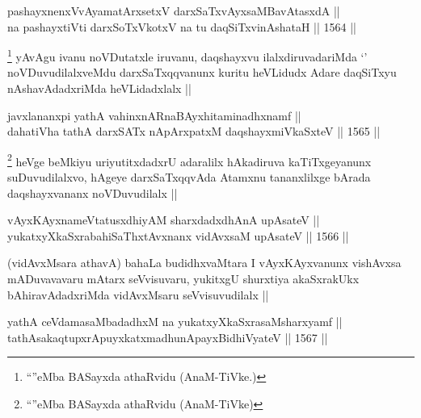 
\begin{shl}
pashayxnenxVvAyamatArx\s \s setxV darxSaTxvAyxsaMBavAtasxdA || \\
na pashayxtiVti darxSoTxVkotxV na tu daqSiTxvinAshataH ||  1564 ||  
\end{shl}

\begin{artha}
\footnote{``\stext''eMba BASayxda athaRvidu (AnaM-TiVke.)}
yAvAgu ivanu noVDutatxle iruvanu, daqshayxvu ilalxdiruvadariMda `\stext' noVDuvudilalxveMdu darxSaTxqqvanunx kuritu heVLidudx Adare daqSiTxyu nAshavAdadxriMda heVLidadxlalx ||
\end{artha}

\begin{shl}
javxlananxpi yathA vahinxnARnaBAyxhitaminadhxnamf || \\
dahatiVha tathA darxSATx nApArxpatxM daqshayxmiVkaSxteV ||  1565 ||  
\end{shl}

\begin{artha}
\footnote{``\stext''eMba BASayxda athaRvidu (AnaM-TiVke)}
heVge beMkiyu uriyutitxdadxrU adaralilx hAkadiruva kaTiTxgeyanunx suDuvudilalxvo, hAgeye darxSaTxqqvAda Atamxnu tananxlilxge bArada daqshayxvananx noVDuvudilalx ||
\end{artha}



\begin{shl}
vAyxKAyxnameVtatusxdhiyAM sharxdadxdhAnA upAsateV || \\
yukatxyXkaSxrabahiSaThxtAvxnanx vidAvxsaM upAsateV ||  1566 ||  
\end{shl}

\begin{artha}
(vidAvxMsara athavA) bahaLa budidhxvaMtara I vAyxKAyxvanunx vishAvxsa mADuvavavaru mAtarx seVvisuvaru, yukitxgU shurxtiya akaSxrakUkx bAhiravAdadxriMda vidAvxMsaru seVvisuvudilalx ||
\end{artha}

\begin{shl}
yathA ceVdamasaMbadadhxM na yukatxyXkaSxrasaMsharxyamf || \\
tathA\s sakaqtupxrA\s puyxkatxmadhunA\s payxBidhiVyateV ||  1567 ||  
\end{shl}

